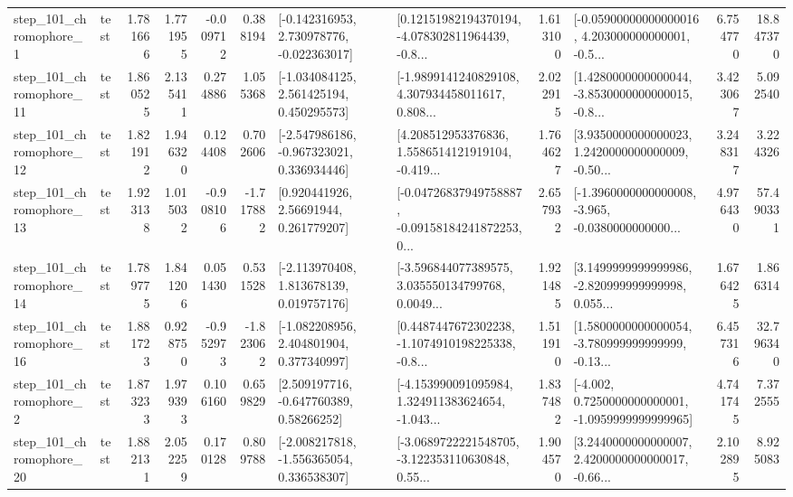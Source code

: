 \begin{tabular}{llrrrrllrlrr}
   step\_101\_chromophore\_1 &      test &      1.781666 &    1.771955 &     -0.009712 &  0.388194 &   [-0.142316953, 2.730978776, -0.022363017] &  [0.12151982194370194, -4.078302811964439, -0.8... &       1.613100 &  [-0.05900000000000016, 4.203000000000001, -0.5... &            6.754770 &         18.847370 \\
  step\_101\_chromophore\_11 &      test &      1.860525 &    2.135411 &      0.274886 &  1.055368 &    [-1.034084125, 2.561425194, 0.450295573] &  [-1.9899141240829108, 4.307934458011617, 0.808... &       2.022915 &  [1.4280000000000044, -3.8530000000000015, -0.8... &            3.423067 &          5.092540 \\
  step\_101\_chromophore\_12 &      test &      1.821912 &    1.946320 &      0.124408 &  0.702606 &   [-2.547986186, -0.967323021, 0.336934446] &  [4.208512953376836, 1.5586514121919104, -0.419... &       1.764627 &  [3.9350000000000023, 1.2420000000000009, -0.50... &            3.248317 &          3.224326 \\
  step\_101\_chromophore\_13 &      test &      1.923138 &    1.015032 &     -0.908106 & -1.717882 &      [0.920441926, 2.56691944, 0.261779207] &  [-0.04726837949758887, -0.09158184241872253, 0... &       2.657932 &  [-1.3960000000000008, -3.965, -0.0380000000000... &            4.976430 &         57.490331 \\
  step\_101\_chromophore\_14 &      test &      1.789775 &    1.841206 &      0.051430 &  0.531528 &    [-2.113970408, 1.813678139, 0.019757176] &  [-3.596844077389575, 3.035550134799768, 0.0049... &       1.921485 &  [3.1499999999999986, -2.820999999999998, 0.055... &            1.676425 &          1.866314 \\
  step\_101\_chromophore\_16 &      test &      1.881723 &    0.928750 &     -0.952973 & -1.823062 &    [-1.082208956, 2.404801904, 0.377340997] &  [0.4487447672302238, -1.1074910198225338, -0.8... &       1.511910 &  [1.5800000000000054, -3.780999999999999, -0.13... &            6.457316 &         32.796340 \\
   step\_101\_chromophore\_2 &      test &      1.873233 &    1.979393 &      0.106160 &  0.659829 &     [2.509197716, -0.647760389, 0.58266252] &  [-4.153990091095984, 1.324911383624654, -1.043... &       1.837482 &  [-4.002, 0.7250000000000001, -1.0959999999999965] &            4.741745 &          7.372555 \\
  step\_101\_chromophore\_20 &      test &      1.882131 &    2.052259 &      0.170128 &  0.809788 &   [-2.008217818, -1.556365054, 0.336538307] &  [-3.0689722221548705, -3.122353110630848, 0.55... &       1.904570 &  [3.2440000000000007, 2.4200000000000017, -0.66... &            2.102895 &          8.925083 \\

\end{tabular}
